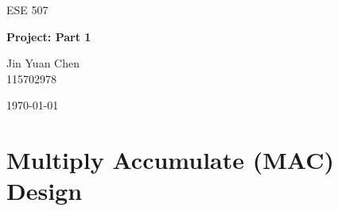 \documentclass[a4paper,11pt]{article}
\begin{document}

\hypersetup{pageanchor=false}
\begin{titlepage}

\centering

\vspace*{1.5in}

{\Large ESE 507\par}

\vspace{0.5in}

{\Huge\bfseries Project: Part 1\par}

\vspace{1in}

{\large
Jin Yuan Chen\\[0.25em]
115702978
\par}

\vfill

{\large \today\par}

\end{titlepage}
\hypersetup{pageanchor=true}






\clearpage
{}
\tableofcontents
\clearpage
{}

\section{Multiply Accumulate (MAC) Design}
\end{document}
